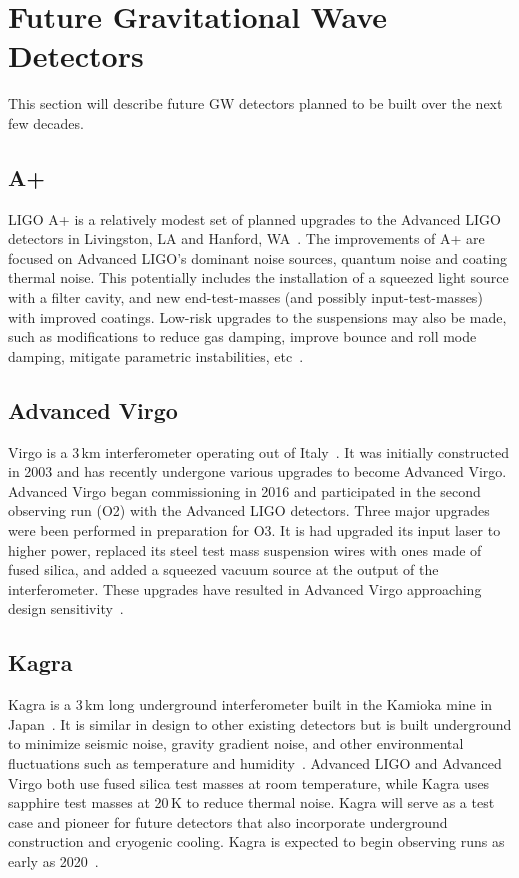 \section{Future Gravitational Wave Detectors}

This section will describe future GW detectors planned to be built over the next few decades.

\subsection{A+}

LIGO A+ is a relatively modest set of planned upgrades to the Advanced LIGO detectors in Livingston, LA and Hanford, WA~\cite{miller2015prospects}. The improvements of A+ are focused on Advanced LIGO's dominant noise sources, quantum noise and coating thermal noise. This potentially includes the installation of a squeezed light source with a filter cavity, and new end-test-masses (and possibly input-test-masses) with improved coatings. Low-risk upgrades to the suspensions may also be made, such as modifications to reduce gas damping, improve bounce and roll mode damping, mitigate parametric instabilities, etc~\cite{whitepaper2018}.

\subsection{Advanced Virgo}

Virgo is a 3\,km interferometer operating out of Italy~\cite{AdVirgo}. It was initially constructed in 2003 and has recently undergone various upgrades to become Advanced Virgo. Advanced Virgo began commissioning in 2016 and participated in the second observing run (O2) with the Advanced LIGO detectors. Three major upgrades were been performed in preparation for O3. It is had upgraded its input laser to higher power, replaced its steel test mass suspension wires with ones made of fused silica, and added a squeezed vacuum source at the output of the interferometer. These upgrades have resulted in Advanced Virgo approaching design sensitivity~\cite{AdVirgo, whitepaper2018}.

\subsection{Kagra}

Kagra is a 3\,km long underground interferometer built in the Kamioka mine in Japan~\cite{2013PhRvD..88d3007A, aso2013interferometer}. It is similar in design to other existing detectors but is built underground to minimize seismic noise, gravity gradient noise, and other environmental fluctuations such as temperature and humidity~\cite{Somiya2012detector}. Advanced LIGO and Advanced Virgo both use fused silica test masses at room temperature, while Kagra uses sapphire test masses at 20\,K to reduce thermal noise. Kagra will serve as a test case and pioneer for future detectors that also incorporate underground construction and cryogenic cooling. Kagra is expected to begin observing runs as early as 2020~\cite{2013PhRvD..88d3007A, Somiya2012detector, aso2013interferometer}.

